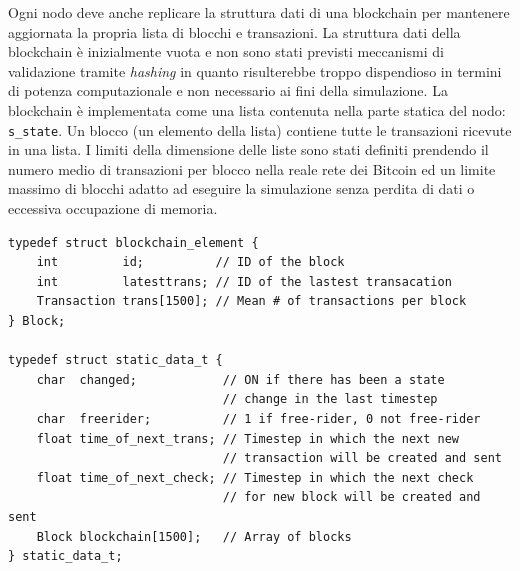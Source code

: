 Ogni nodo deve anche replicare la struttura dati di una blockchain per mantenere aggiornata la propria lista di blocchi e transazioni. La struttura dati della blockchain è inizialmente vuota e non sono stati previsti meccanismi di validazione tramite \textit{hashing} in quanto risulterebbe troppo dispendioso in termini di potenza computazionale e non necessario ai fini della simulazione. La blockchain è implementata come una lista contenuta nella parte statica del nodo: \texttt{s\_state}. Un blocco (un elemento della lista) contiene tutte le transazioni ricevute in una lista. I limiti della dimensione delle liste sono stati definiti prendendo il numero medio di transazioni per blocco nella reale rete dei Bitcoin ed un limite massimo di blocchi adatto ad eseguire la simulazione senza perdita di dati o eccessiva occupazione di memoria.
\begin{code}
\begin{verbatim}
typedef struct blockchain_element {
    int         id;          // ID of the block
    int         latesttrans; // ID of the lastest transacation
    Transaction trans[1500]; // Mean # of transactions per block
} Block;

typedef struct static_data_t {
    char  changed;            // ON if there has been a state
                              // change in the last timestep
    char  freerider;          // 1 if free-rider, 0 not free-rider
    float time_of_next_trans; // Timestep in which the next new
                              // transaction will be created and sent
    float time_of_next_check; // Timestep in which the next check
                              // for new block will be created and sent
    Block blockchain[1500];   // Array of blocks
} static_data_t;
\end{verbatim}


\end{code}
